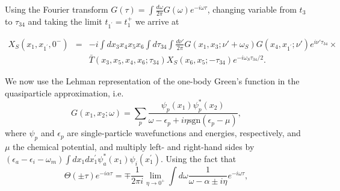 \documentclass[a4paper,superscriptaddress,twocolumn,aps,prb,floatfix,citeautoscript]{revtex4-1}\usepackage[utf8]{inputenc}
\begin{document}
Using the Fourier transform $G(\tau)=\int \frac{d\omega}{2\pi}G(\omega)e^{-i\omega\tau}$, changing variable from $t_3$ to $\tau_{34}$ and taking the limit $t_{1^\prime}=t_1^+$ we arrive at
\begin{widetext}
\begin{eqnarray}
X_S(x_1,x_{1^\prime},0^-)
  &=&-i\int dx_3x_4x_5x_6\int d\tau_{34} \int \frac{d\nu'}{2\pi}G(x_1,x_3;\nu'+\omega_S)G(x_4,x_{1^\prime};\nu')e^{i\nu'\tau_{34}}\times\nonumber\\
  &&\bar{T}(x_3,x_5,x_4,x_6;\tau_{34})X_S(x_6,x_5;-\tau_{34})e^{-i\omega_S\tau_{34}/2}.
\end{eqnarray}
 \end{widetext}
 We now use  the Lehman representation of the one-body Green's function in the quasiparticle approximation, i.e.
$$G(x_1,x_2;\omega)=\sum_{p}\frac{\psi_p(x_1)\psi_p^*(x_2)}{\omega-\epsilon_p+ i\eta \text{sgn}(\epsilon_p-\mu)},$$ where $\psi_p$ and $\epsilon_p$ are single-particle wavefunctions and energies, respectively, and $\mu$ the chemical potential, and multiply left- and right-hand sides by $(\epsilon_a-\epsilon_i-\omega_m)\int dx_1dx^{\prime}_1 \psi^*_a(x_1)\psi_i(x_1^\prime)$.  
Using the fact that
\begin{equation}
\Theta(\pm\tau)e^{-i\alpha \tau}=\mp\frac{1}{2\pi i}\lim_{\eta\rightarrow 0^+}\int d\omega \frac{1}{\omega-\alpha\pm i\eta}e^{-i\omega\tau},
\end{equation}
\end{document}
